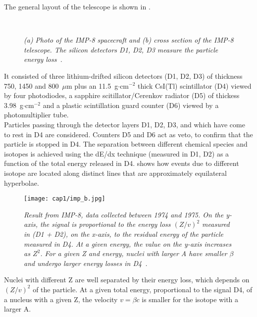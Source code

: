The general layout of the telescope is shown in .
\begin{figure}
  \centering {}
   \\
  \caption{\textit{(a) Photo of the IMP-8 spacecraft and (b) cross section of
      the IMP-8 telescope. The silicon detectors D1, D2, D3 measure the particle
      energy loss~\cite{Spurio}.}}\label{imp_satellite}
\end{figure}
It consisted of three lithium-drifted silicon detectors (D1, D2, D3) of
thickness 750, 1450 and 800~$\mu$m plus an 11.5~g$\cdot$cm$^{-2}$ thick CsI(Tl)
scintillator (D4) viewed by four photodiodes, a sapphire scitillator/Cerenkov
radiator (D5) of thickess 3.98~g$\cdot$cm$^{-2}$ and a plastic scintillation
guard counter (D6) viewed by a photomultiplier
tube.\\
Particles passing through the detector layers D1, D2, D3, and which have come to
rest in D4 are considered. Counters D5 and D6 act as veto, to confirm that the
particle is stopped in D4. The separation between different chemical species and
isotopes is achieved using the dE/dx technique (measured in D1, D2) as a
function of the total energy released in D4.  shows how events due to
different isotope are located along distinct lines that are approximately
equilateral hyperbolae.
\begin{figure}[!htbp]
  \centering
  \texttt{[image: cap1/imp\_b.jpg]}
  \caption{\textit{Result from IMP-8, data collected between 1974 and 1975. On
      the y-axis, the signal is proportional to the energy loss $ (Z/v)^2$
      measured in (D1 + D2), on the x-axis, to the residual energy of the
      particle measured in D4. At a given energy, the value on the y-axis
      increases as $Z^2$. For a given Z and energy, nuclei with larger A have
      smaller $\beta$ and undergo larger energy losses in
      D4~\cite{Spurio}.}}\label{imp_b}
\end{figure}
Nuclei with different Z are well separated by their energy loss, which depends
on $(Z/v)^2$ of the particle. At a given total energy, proportional to the
signal D4, of a nucleus with a given Z, the
velocity $v = \beta c$ is smaller for the isotope with a larger A.\\




















